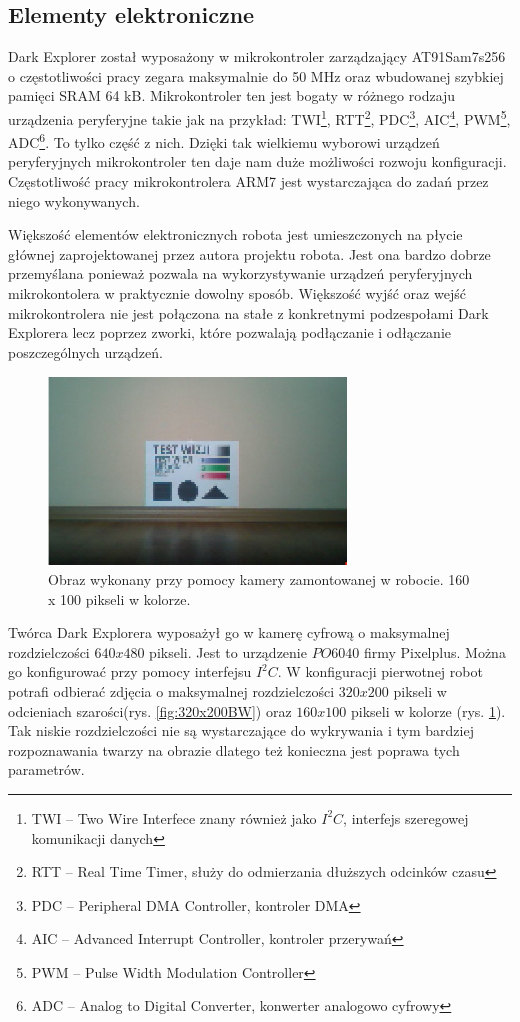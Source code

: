 \subsection{Elementy elektroniczne}
Dark Explorer został wyposażony w mikrokontroler zarządzający AT91Sam7s256 o
częstotliwości pracy zegara maksymalnie do 50 MHz oraz wbudowanej szybkiej
pamięci SRAM 64 kB. Mikrokontroler ten jest bogaty w różnego rodzaju urządzenia
peryferyjne takie jak na przykład: TWI\footnote{TWI -- Two Wire Interfece znany
również jako $I^{2}C$, interfejs szeregowej komunikacji danych}, RTT\footnote{RTT
-- Real Time Timer, służy do odmierzania dłuższych odcinków czasu},
PDC\footnote{PDC -- Peripheral DMA Controller, kontroler DMA}, AIC\footnote{AIC
-- Advanced Interrupt Controller, kontroler przerywań}, PWM\footnote{PWM -- Pulse
Width Modulation Controller}, ADC\footnote{ADC -- Analog to Digital Converter,
konwerter analogowo cyfrowy}. To tylko część z nich. Dzięki tak wielkiemu
wyborowi urządzeń peryferyjnych mikrokontroler ten daje nam duże możliwości
rozwoju konfiguracji. Częstotliwość pracy mikrokontrolera ARM7 jest wystarczająca
do zadań przez niego wykonywanych.

Większość elementów elektronicznych robota jest umieszczonych na płycie głównej
zaprojektowanej przez autora projektu robota. Jest ona bardzo dobrze przemyślana
ponieważ pozwala na wykorzystywanie urządzeń peryferyjnych mikrokontolera w
praktycznie dowolny sposób. Większość wyjść oraz wejść mikrokontrolera nie jest
połączona na stałe z konkretnymi podzespołami Dark Explorera lecz poprzez zworki,
które pozwalają podłączanie i odłączanie poszczególnych urządzeń.

\begin{figure}[!ht]
 \centering
 \includegraphics[height=50mm]{../images/ch02/160x100C.jpg}
 \caption{Obraz wykonany przy pomocy kamery zamontowanej w robocie. 160 x 100 pikseli w kolorze. \cite{KmakMScThesis2009}}
 \label{fig:160x100C}
\end{figure}

Twórca Dark Explorera wyposażył go w kamerę cyfrową o maksymalnej rozdzielczości
$640x480$ pikseli. Jest to urządzenie $PO6040$ firmy Pixelplus. Można go
konfigurować przy pomocy interfejsu $I^{2}C$. W konfiguracji pierwotnej robot
potrafi odbierać zdjęcia o maksymalnej rozdzielczości $320x200$ pikseli w
odcieniach szarości(rys. \ref{fig:320x200BW}) oraz $160x100$ pikseli w kolorze
(rys. \ref{fig:160x100C}). Tak niskie rozdzielczości nie są wystarczające do
wykrywania i tym bardziej rozpoznawania twarzy na obrazie dlatego też konieczna
jest poprawa tych parametrów.

